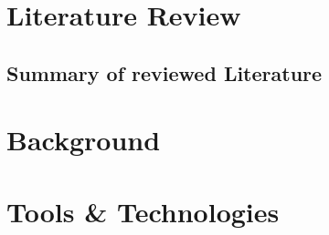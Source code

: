 \section{Literature Review}
\lipsum[6]
\subsection{Summary of reviewed Literature}
\lipsum[6]

\section{Background}
\lipsum[20]
\section{Tools \& Technologies}
\lipsum[2-4]

